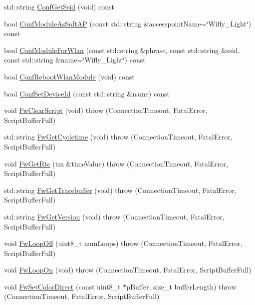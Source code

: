 \begin{DoxyCompactItemize}
\item 
std\-::string \hyperlink{class_wifly_control_aa46eb435216680bdb7e069571e7f7545}{Conf\-Get\-Ssid} (void) const 
\item 
bool \hyperlink{class_wifly_control_a2728aad7816abfbf9d4acdfb191c5bb3}{Conf\-Module\-As\-Soft\-A\-P} (const std\-::string \&accesspoint\-Name=\char`\"{}Wifly\-\_\-\-Light\char`\"{}) const 
\item 
bool \hyperlink{class_wifly_control_a6535a5148e4da9fb62460aeefba22fcc}{Conf\-Module\-For\-Wlan} (const std\-::string \&phrase, const std\-::string \&ssid, const std\-::string \&name=\char`\"{}Wifly\-\_\-\-Light\char`\"{}) const 
\item 
bool \hyperlink{class_wifly_control_a2562a7dfca209f533b537b1667dde91c}{Conf\-Reboot\-Wlan\-Module} (void) const 
\item 
bool \hyperlink{class_wifly_control_a8a3142eab30bfc15ffd871cb4a139522}{Conf\-Set\-Device\-Id} (const std\-::string \&name) const 
\item 
void \hyperlink{class_wifly_control_a0cb531078a50475b0244645e95903e73}{Fw\-Clear\-Script} (void)  throw (\-Connection\-Timeout, Fatal\-Error, Script\-Buffer\-Full)
\item 
std\-::string \hyperlink{class_wifly_control_a526613f649f34d881cb4dc9f663c32b6}{Fw\-Get\-Cycletime} (void)  throw (\-Connection\-Timeout, Fatal\-Error, Script\-Buffer\-Full)
\item 
void \hyperlink{class_wifly_control_a4f8ce58a504afd4f565ea0441005854e}{Fw\-Get\-Rtc} (tm \&time\-Value)  throw (\-Connection\-Timeout, Fatal\-Error, Script\-Buffer\-Full)
\item 
std\-::string \hyperlink{class_wifly_control_a94d4a985ee5f514ccfbc896c58253dc2}{Fw\-Get\-Tracebuffer} (void)  throw (\-Connection\-Timeout, Fatal\-Error, Script\-Buffer\-Full)
\item 
std\-::string \hyperlink{class_wifly_control_ab3d9c5dec8035fbf59c9ef040bfdc434}{Fw\-Get\-Version} (void)  throw (\-Connection\-Timeout, Fatal\-Error, Script\-Buffer\-Full)
\item 
void \hyperlink{class_wifly_control_a9ae98d3887ca872dfff612be72269ea0}{Fw\-Loop\-Off} (uint8\-\_\-t num\-Loops)  throw (\-Connection\-Timeout, Fatal\-Error, Script\-Buffer\-Full)
\item 
void \hyperlink{class_wifly_control_a5aac29f47034a0d8f5d4ab9ed43ae570}{Fw\-Loop\-On} (void)  throw (\-Connection\-Timeout, Fatal\-Error, Script\-Buffer\-Full)
\item 
void \hyperlink{class_wifly_control_a2226fadb85875865d58b11ea40b352c8}{Fw\-Set\-Color\-Direct} (const uint8\-\_\-t $\ast$p\-Buffer, size\-\_\-t buffer\-Length)  throw (\-Connection\-Timeout, Fatal\-Error, Script\-Buffer\-Full)

\end{DoxyCompactItemize}
